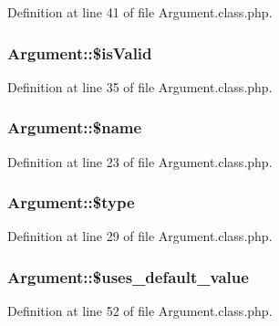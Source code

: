 Definition at line 41 of file Argument.\+class.\+php.

\hypertarget{classArgument_af1a5d4055fd3e16bea7951843a3bdd92}{
\subsubsection[{\$is\+Valid}]{\setlength{\rightskip}{0pt plus 5cm}Argument\+::\$is\+Valid}}\label{classArgument_af1a5d4055fd3e16bea7951843a3bdd92}


Definition at line 35 of file Argument.\+class.\+php.

\hypertarget{classArgument_ab37a45cb92464255505b2f4f35909da6}{
\subsubsection[{\$name}]{\setlength{\rightskip}{0pt plus 5cm}Argument\+::\$name}}\label{classArgument_ab37a45cb92464255505b2f4f35909da6}


Definition at line 23 of file Argument.\+class.\+php.

\hypertarget{classArgument_a7a2272bc3d12787f80143fbea01698f4}{
\subsubsection[{\$type}]{\setlength{\rightskip}{0pt plus 5cm}Argument\+::\$type}}\label{classArgument_a7a2272bc3d12787f80143fbea01698f4}


Definition at line 29 of file Argument.\+class.\+php.

\hypertarget{classArgument_a3f8f20477043da002ba9d48ede482baf}{
\subsubsection[{\$uses\+\_\+default\+\_\+value}]{\setlength{\rightskip}{0pt plus 5cm}Argument\+::\$uses\+\_\+default\+\_\+value}}\label{classArgument_a3f8f20477043da002ba9d48ede482baf}


Definition at line 52 of file Argument.\+class.\+php.

